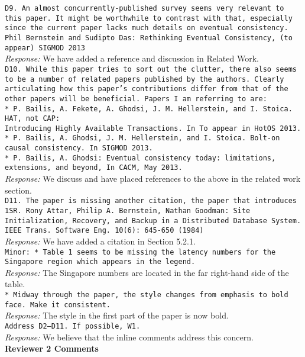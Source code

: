 \documentclass[10pt]{article}
\newcommand{\reviewer}[1] {\noindent\texttt{#1}\\}
\newcommand{\response}[1] {\noindent\textit{Response: } #1\\}
\begin{document}
\reviewer{D9. An almost concurrently-published survey seems very relevant to this paper. It might be worthwhile to contrast with that, especially since the current paper lacks much details on eventual consistency. Phil Bernstein and Sudipto Das: Rethinking Eventual Consistency, (to appear) SIGMOD 2013}

\response{We have added a reference and discussion in Related Work.}

\reviewer{D10. While this paper tries to sort out the clutter, there also seems to be a number of related papers published by the authors. Clearly articulating how this paper's contributions differ from that of the other papers will be beneficial. Papers I am referring to are: \\
* P. Bailis, A. Fekete, A. Ghodsi, J. M. Hellerstein, and I. Stoica. HAT, not CAP: \\
 Introducing Highly Available Transactions. In To appear in HotOS 2013.\\
* P. Bailis, A. Ghodsi, J. M. Hellerstein, and I. Stoica. Bolt-on causal consistency. In SIGMOD 2013. \\
* P. Bailis, A. Ghodsi: Eventual consistency today: limitations, extensions, and beyond, In CACM, May 2013.}

\response{We discuss and have placed references to the above in the related work section.}

\reviewer{D11. The paper is missing another citation, the paper that introduces 1SR. 
Rony Attar, Philip A. Bernstein, Nathan Goodman: Site Initialization, Recovery, and Backup in a Distributed Database System. IEEE Trans. Software Eng. 10(6): 645-650 (1984)}

\response{We have added a citation in Section 5.2.1.}

\reviewer{Minor: 
* Table 1 seems to be missing the latency numbers for the Singapore region which appears in the legend.}

\response{The Singapore numbers are located in the far right-hand side of the table.}

\reviewer{* Midway through the paper, the style changes from emphasis to bold face. Make it consistent.}

\response{The style in the first part of the paper is now bold.}

\reviewer{Address D2--D11. If possible, W1.}

\response{We believe that the inline comments address this concern.}

\newpage
\noindent\textbf{Reviewer 2 Comments}\\
\end{document}
